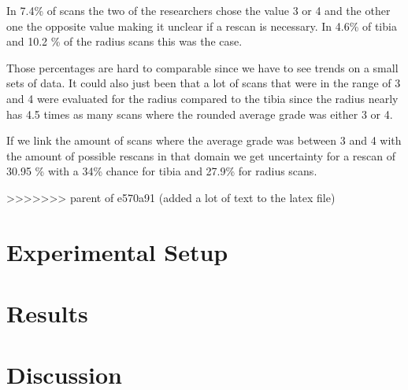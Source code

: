 \documentclass[
a4paper, 
12pt,
grayscalebody, %
abstract=on,
twoside, BCOR10mm, 12pt, DIV13,headinclude, footexclude, final, abstracton, openright
]{ibireprt}
\numberwithin{equation}{chapter}
\numberwithin{table}{chapter}
\numberwithin{figure}{chapter}
\numberwithin{algorithm}{chapter}
\numberwithin{example}{chapter}
\numberwithin{example}{chapter}
\begin{document}
In 7.4\% of scans the two of the researchers chose the value 3 or 4 and the other one the opposite value making it unclear if a rescan is necessary. In 4.6\% of tibia and 10.2 \% of the radius scans this was the case. 

Those percentages are hard to comparable since we have to see trends on a small sets of data. It could also just been that a lot of scans that were in the range of 3 and 4 were evaluated for the radius compared to the tibia since the radius nearly has 4.5 times as many scans where the rounded average grade was either 3 or 4.


If we link the amount of scans where the average grade was between 3 and 4 with the amount of possible rescans in that domain we get uncertainty for a rescan of 30.95 \% with a 34\% chance for tibia and 27.9\% for radius scans. 

>>>>>>> parent of e570a91 (added a lot of text to the latex file)
\chapter{Experimental Setup}



\chapter{Results}

\chapter{Discussion}


\end{document}
